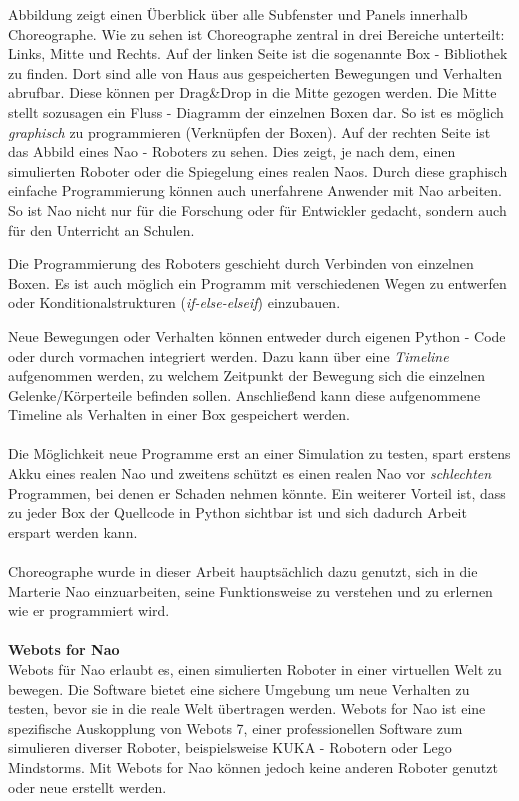 Abbildung  zeigt einen Überblick über alle Subfenster und Panels innerhalb Choreographe. Wie zu sehen ist Choreographe zentral in drei Bereiche unterteilt: Links, Mitte und Rechts.
Auf der linken Seite ist die sogenannte Box - Bibliothek zu finden. Dort sind alle von Haus aus gespeicherten Bewegungen und Verhalten abrufbar. Diese können per Drag\&Drop in die Mitte gezogen werden. Die Mitte stellt sozusagen ein Fluss - Diagramm der einzelnen Boxen dar. So ist es möglich \textit{graphisch} zu programmieren (Verknüpfen der Boxen). Auf der rechten Seite ist das Abbild eines Nao - Roboters zu sehen. Dies zeigt, je nach dem, einen simulierten Roboter oder die Spiegelung eines realen Naos. 
Durch diese graphisch einfache Programmierung können auch unerfahrene Anwender mit Nao arbeiten. So ist Nao nicht nur für die Forschung oder für Entwickler gedacht, sondern auch für den Unterricht an Schulen.

Die Programmierung des Roboters geschieht durch Verbinden von einzelnen Boxen. Es ist auch möglich ein Programm mit verschiedenen Wegen zu entwerfen oder Konditionalstrukturen (\textit{if-else-elseif}) einzubauen.

Neue Bewegungen oder Verhalten können entweder durch eigenen Python - Code oder durch vormachen integriert werden. Dazu kann über eine \textit{Timeline} aufgenommen werden, zu welchem Zeitpunkt der Bewegung sich die einzelnen Gelenke/Körperteile befinden sollen. Anschließend kann diese aufgenommene Timeline als Verhalten in einer Box gespeichert werden.
\\
\\
Die Möglichkeit neue Programme erst an einer Simulation zu testen, spart erstens Akku eines realen Nao und zweitens schützt es einen realen Nao vor \textit{schlechten} Programmen, bei denen er Schaden nehmen könnte. Ein weiterer Vorteil ist, dass zu jeder Box der Quellcode in Python sichtbar ist und sich dadurch Arbeit erspart werden kann.
\\
\\
Choreographe wurde in dieser Arbeit hauptsächlich dazu genutzt, sich in die Marterie Nao einzuarbeiten, seine Funktionsweise zu verstehen und zu erlernen wie er programmiert wird.
\\
\\
\textbf{Webots for Nao}
\\
Webots für Nao erlaubt es, einen simulierten Roboter in einer virtuellen Welt zu bewegen. Die Software bietet eine sichere Umgebung um neue Verhalten zu testen, bevor sie in die reale Welt übertragen werden. Webots for Nao ist eine spezifische Auskopplung von Webots 7, einer professionellen Software zum simulieren diverser Roboter, beispielsweise KUKA - Robotern oder Lego Mindstorms. Mit Webots for Nao können jedoch keine anderen Roboter genutzt oder neue erstellt werden.


